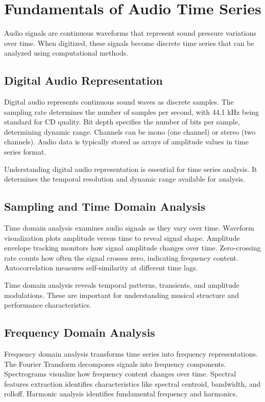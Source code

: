 \section{Fundamentals of Audio Time Series}

Audio signals are continuous waveforms that represent sound pressure variations over time. When digitized, these signals become discrete time series that can be analyzed using computational methods.

\subsection{Digital Audio Representation}

Digital audio represents continuous sound waves as discrete samples. The sampling rate determines the number of samples per second, with 44.1 kHz being standard for CD quality. Bit depth specifies the number of bits per sample, determining dynamic range. Channels can be mono (one channel) or stereo (two channels). Audio data is typically stored as arrays of amplitude values in time series format.

Understanding digital audio representation is essential for time series analysis. It determines the temporal resolution and dynamic range available for analysis.

\subsection{Sampling and Time Domain Analysis}

Time domain analysis examines audio signals as they vary over time. Waveform visualization plots amplitude versus time to reveal signal shape. Amplitude envelope tracking monitors how signal amplitude changes over time. Zero-crossing rate counts how often the signal crosses zero, indicating frequency content. Autocorrelation measures self-similarity at different time lags.

Time domain analysis reveals temporal patterns, transients, and amplitude modulations. These are important for understanding musical structure and performance characteristics.

\subsection{Frequency Domain Analysis}

Frequency domain analysis transforms time series into frequency representations. The Fourier Transform decomposes signals into frequency components. Spectrograms visualize how frequency content changes over time. Spectral features extraction identifies characteristics like spectral centroid, bandwidth, and rolloff. Harmonic analysis identifies fundamental frequency and harmonics.

